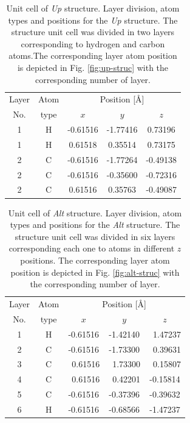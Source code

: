 \documentclass[prb,11pt,tightenlines,twocolumn,aps]{revtex4-1}
\begin{document}
\begin{table}[t]
\center
\begin{tabular}{ccccc}\\
\hline
\quad Layer \quad & \quad Atom \qquad & \multicolumn{3}{c}{Position [\AA]} \\
\cline{3-5}
\quad No.   \quad & \quad type \qquad & $x$ & $y$ & $z$  \\
\hline
1 & H & -0.61516 & -1.77416 &  0.73196 \\
1 & H &  0.61518 &  0.35514 &  0.73175 \\
2 & C & -0.61516 & -1.77264 & -0.49138 \\
2 & C & -0.61516 & -0.35600 & -0.72316 \\
2 & C &  0.61516 &  0.35763 & -0.49087 \\
\hline
\end{tabular}

\caption{Unit cell of \emph{Up} structure. Layer division, atom types and
positions for the \emph{Up} structure. The structure unit cell was divided in
two layers corresponding to hydrogen and carbon atoms.The corresponding layer
atom position is depicted in Fig. \ref{fig:up-struc} with the corresponding
number of layer.}
\label{tab:up-unitcell}
\end{table}
% 
% 
\begin{table}[t]
\center
\begin{tabular}{ccccc}\\
\hline
\quad Layer \quad & \quad Atom \qquad & \multicolumn{3}{c}{Position [\AA]} \\
\cline{3-5}
\quad No.   \quad & \quad type \qquad & $x$ & $y$ & $z$  \\
\hline
1 & H &  -0.61516 &  -1.42140 & \ 1.47237 \\
2 & C &  -0.61516 &  -1.73300 & \ 0.39631 \\
3 & C & \ 0.61516 & \ 1.73300 & \ 0.15807 \\
4 & C & \ 0.61516 & \ 0.42201 &  -0.15814 \\
5 & C &  -0.61516 &  -0.37396 &  -0.39632 \\
6 & H &  -0.61516 &  -0.68566 &  -1.47237 \\
\hline
\end{tabular}

\caption{Unit cell of \emph{Alt} structure. Layer division, atom types and
positions for the \emph{Alt} structure. The structure unit cell was divided in
six layers corresponding each one to atoms in different $z$ positions. The
corresponding layer atom position is depicted in Fig. \ref{fig:alt-struc} with
the corresponding number of layer.}
\label{tab:alt-unitcell}
\end{table}
\end{document}
